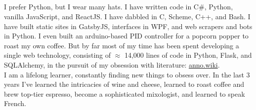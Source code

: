 \documentclass[9pt]{developercv} %
\begin{document}
\begin{minipage}[t]{0.275\textwidth} %
    \vspace{-\baselineskip} %

    \\
    \\
    \\
    \\
\end{minipage}




    I prefer Python, but I wear many hats. I have written code in C\#,
    Python, vanilla JavaScript, and ReactJS. I have dabbled in C, Scheme, C++,
    and Bash. I have built static sites in GatsbyJS, interfaces in WPF, and web
    scrapers and bots in Python. I even built an arduino-based PID controller
    for a popcorn popper to roast my own coffee. But by far most of my time has
    been spent developing a single web technology, consisting of $\approx$
    14,000 lines of code in Python, Flask, and SQLAlchemy, in the pursuit of my
    obsession with literature:
    {\href{https://github.com/malan88/icc}{anno.wiki}}.\\

    I am a lifelong learner, constantly finding new things to obsess over. In
    the last 3 years I've learned the intricacies of wine and cheese, learned to
    roast coffee and brew top-tier espresso, become a sophisticated mixologist,
    and learned to speak French.\\
\end{document}
